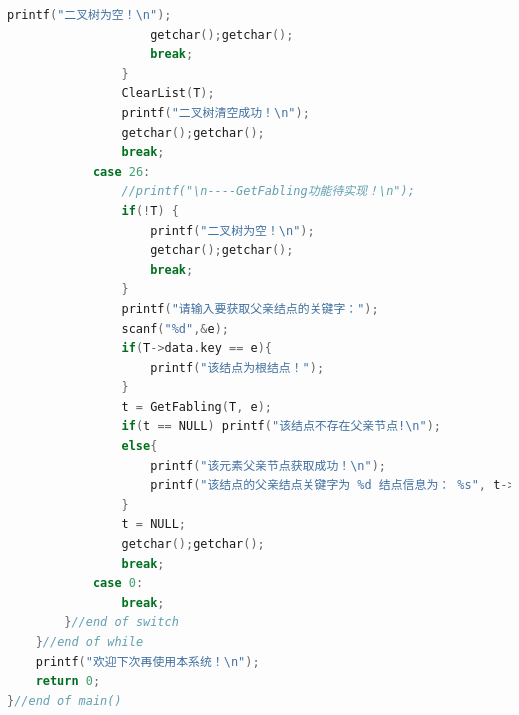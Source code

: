 \documentclass[supercite]{Experimental_Report}
\theoremstyle{definition}
\begin{document}
\begin{lstlisting}[language=c]
                    printf("二叉树为空！\n");
                    getchar();getchar();
                    break;
                }
                ClearList(T); 
                printf("二叉树清空成功！\n");
                getchar();getchar();
                break; 
			case 26:
                //printf("\n----GetFabling功能待实现！\n");
                if(!T) {
                    printf("二叉树为空！\n");
                    getchar();getchar();
                    break;
                }
                printf("请输入要获取父亲结点的关键字：");
                scanf("%d",&e);
                if(T->data.key == e){
                    printf("该结点为根结点！");
                }
                t = GetFabling(T, e);
                if(t == NULL) printf("该结点不存在父亲节点!\n");
                else{
                    printf("该元素父亲节点获取成功！\n");
                    printf("该结点的父亲结点关键字为 %d 结点信息为： %s", t->data.key, t->data.others);
                }
                t = NULL;
                getchar();getchar();
                break;   
            case 0:
                break;
        }//end of switch
    }//end of while
    printf("欢迎下次再使用本系统！\n");
    return 0;
}//end of main()

\end{lstlisting}

\newpage
\end{document}
